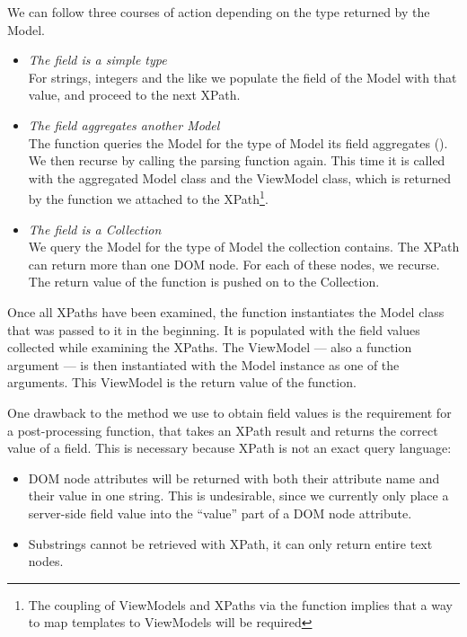 \documentclass[thesis.tex]{subfiles}
\begin{document}
We can follow three courses of action depending on the type
returned by the Model.
\begin{itemize}
	\item \emph{The field is a simple type}\\
	For strings, integers and the like we populate the field of the Model
	with that value, and proceed to the next XPath.
	\item \emph{The field aggregates another Model}\\
	The function queries the Model for the type of Model its field aggregates
	().
	We then recurse by calling the parsing function again.
	This time it is called with the aggregated Model class and
	the ViewModel class, which is returned by the  function
	we attached to the XPath\footnote{The coupling of ViewModels and XPaths
	via the  function implies that a way to map templates to
	ViewModels will be required}.
	\item \emph{The field is a Collection}\\
	We query the Model for the type of Model the collection contains.
	The XPath can return more than one DOM node.
	For each of these nodes, we recurse.
	The return value of the function is pushed on to the Collection.
\end{itemize}

Once all XPaths have been examined, the function instantiates the Model class
that was passed to it in the beginning. It is populated with the field values
collected while examining the XPaths.
The ViewModel --- also a function argument --- is then instantiated with
the Model instance as one of the arguments.
This ViewModel is the return value of the function.

One drawback to the method we use to obtain field values is the requirement
for a post-processing function, that takes an XPath result and
returns the correct value of a field.
This is necessary because XPath is not an exact query language:
\begin{itemize}
	\item DOM node attributes will be returned with both their attribute name and
	their value in one string. This is undesirable, since we currently only
	place a server-side field value into the ``value'' part of a DOM node
	attribute.
	\item Substrings cannot be retrieved with XPath, it can only return entire
	text nodes.
\end{itemize}
\end{document}
